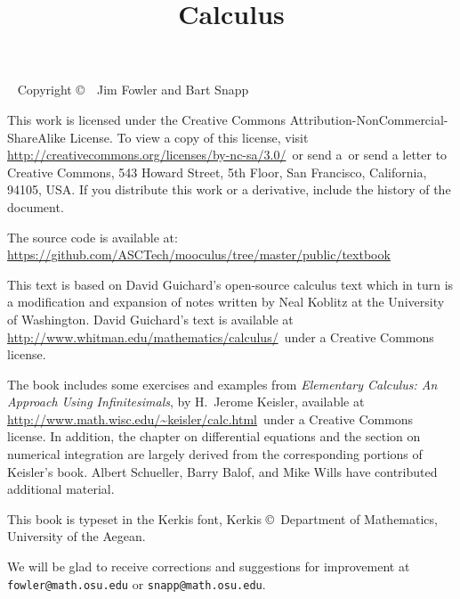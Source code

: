 \documentclass[justified,openany,nofonts]{tufte-book}
\title{Calculus}
\begin{document}
\maketitle



\begin{fullwidth}
~\vfill
\thispagestyle{empty}
\setlength{\parindent}{0pt}
\setlength{\parskip}{\baselineskip}
Copyright \copyright\ \the\year\ Jim Fowler and Bart Snapp

This work is licensed under the Creative Commons
Attribution-NonCommercial-ShareAlike License. To view a copy of this
license, visit
\url{http://creativecommons.org/licenses/by-nc-sa/3.0/}~or send a~or send a
letter to Creative Commons, 543 Howard Street, 5th Floor, San
Francisco, California, 94105, USA. If you distribute this work or a
derivative, include the history of the document. 

The source code is available
at: \url{https://github.com/ASCTech/mooculus/tree/master/public/textbook}

\noindent
This text is based on David Guichard's open-source calculus text which
in turn is a modification and expansion of notes written by Neal
Koblitz at the University of Washington. David Guichard's text is
available at \url{http://www.whitman.edu/mathematics/calculus/}~under a Creative Commons license.

\noindent The book includes some exercises and examples from {\it
  Elementary Calculus: An Approach Using Infinitesimals}, by H.~Jerome
Keisler, available at
\url{http://www.math.wisc.edu/~keisler/calc.html}~under a Creative
Commons license. In addition, the chapter on differential equations
and the section on numerical integration are largely derived from the
corresponding portions of Keisler's book.  Albert Schueller, Barry
Balof, and Mike Wills have contributed additional material.

\noindent This book is typeset in the Kerkis font, 
Kerkis \copyright~Department of Mathematics, University of the Aegean.


\noindent We will be glad to receive corrections and suggestions for
improvement at \texttt{fowler@math.osu.edu} or
\texttt{snapp@math.osu.edu}.

\end{fullwidth}
\end{document}
